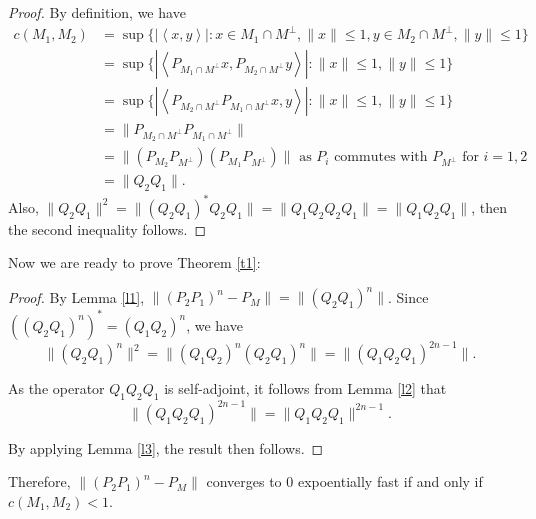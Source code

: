 \begin{proof}
By definition, we have
\begin{align*}
c(M_1,M_2)&=\sup\{|\left\langle x,y\right\rangle|\colon x\in M_{1}\cap M^{\perp}, \|x\|\leq 1, y\in M_2\cap M^{\perp},\|y\|\leq 1\}\\
{}&=\sup\{|\left\langle P_{M_1\cap M^{\perp}}x, P_{M_2\cap M^{\perp}}y\right\rangle|\colon \|x\|\leq 1,\|y\|\leq 1\}\\
{}&=\sup\{|\left\langle P_{M_2\cap M^{\perp}}P_{M_1\cap M^{\perp}}x, y\right\rangle|\colon \|x\|\leq 1,\|y\|\leq 1\}\\
{}&=\|P_{M_2\cap M^{\perp}}P_{M_1\cap M^{\perp}}\|\\
{}&=\|(P_{M_2}P_{M^{\perp}})(P_{M_1}P_{M^{\perp}})\| \mbox{ as } P_{i} \mbox{ commutes with } P_{M^{\perp}} \mbox{ for } i=1,2 \\
{}&=\|Q_2Q_1\|.
\end{align*}
Also, $\|Q_2Q_1\|^2=\|(Q_2Q_1)^{\ast}Q_2Q_1\|=\|Q_1Q_2Q_2Q_1\|=\|Q_1Q_2Q_1\|$, then the second inequality follows.
\end{proof}
Now we are ready to prove Theorem \ref{t1}:
\begin{proof}
By Lemma \ref{l1}, $\|(P_2P_1)^n-P_M\|=\|(Q_2Q_1)^n\|$. Since $((Q_2Q_1)^n)^{\ast}=(Q_1Q_2)^n$, we have 
$$\|(Q_2Q_1)^n\|^2=\|(Q_1Q_2)^n(Q_2Q_1)^n\|=\|(Q_1Q_2Q_1)^{2n-1}\|.$$

As the operator $Q_1Q_2Q_1$ is self-adjoint, it follows from Lemma \ref{l2} that $$\|(Q_1Q_2Q_1)^{2n-1}\|=\|Q_1Q_2Q_1\|^{2n-1}.$$

By applying Lemma \ref{l3}, the result then follows.
\end{proof}
Therefore, $\|(P_2P_1)^n-P_M\|$ converges to $0$ expoentially fast if and only if $c(M_1,M_2)<1$.
\par

